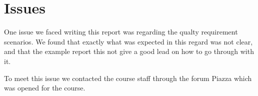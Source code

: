 \section{Issues}
One issue we faced writing this report was regarding the qualty requirement scenarios. We found that exactly what was expected in this regard was not clear, and that the example report this not give a good lead on how to go through with it.

To meet this issue we contacted the course staff through the forum Piazza which was opened for the course. 
